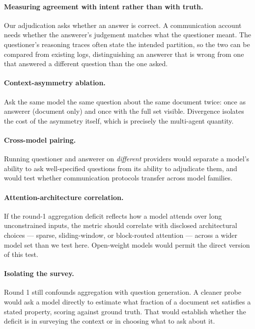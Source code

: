 \documentclass[11pt]{article}
\begin{document}
\paragraph{Measuring agreement with intent rather than with truth.} Our
adjudication asks whether an answer is correct. A communication account needs
whether the answerer's judgement matches what the questioner meant. The
questioner's reasoning traces often state the intended partition, so the two can
be compared from existing logs, distinguishing an answerer that is wrong from
one that answered a different question than the one asked.

\paragraph{Context-asymmetry ablation.} Ask the same model the same question
about the same document twice: once as answerer (document only) and once with
the full set visible. Divergence isolates the cost of the asymmetry itself,
which is precisely the multi-agent quantity.

\paragraph{Cross-model pairing.} Running questioner and answerer on
\emph{different} providers would separate a model's ability to ask
well-specified questions from its ability to adjudicate them, and would test
whether communication protocols transfer across model families.



\paragraph{Attention-architecture correlation.} If the round-1 aggregation
deficit reflects how a model attends over long unconstrained inputs, the metric
should correlate with disclosed architectural choices --- sparse,
sliding-window, or block-routed attention --- across a wider model set than we
test here. Open-weight models would permit the direct version of this test.

\paragraph{Isolating the survey.} Round 1 still confounds aggregation with
question generation. A cleaner probe would ask a model directly to estimate what
fraction of a document set satisfies a stated property, scoring against ground
truth. That would establish whether the deficit is in surveying the context or
in choosing what to ask about it.
\end{document}
